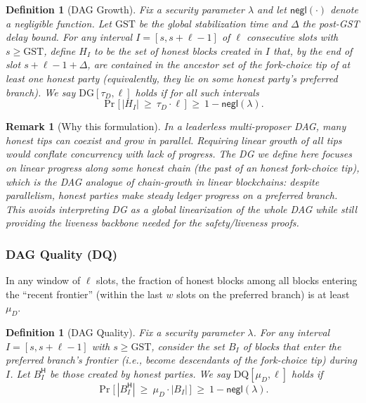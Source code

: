 \documentclass[11pt]{article}
\newtheorem{definition}[theorem]{Definition}
\newtheorem{remark}[theorem]{Remark}
\newcommand{\negl}{\ensuremath{\mathsf{negl}}\xspace}
\begin{document}
\begin{definition}[DAG Growth]\label{def:DG}
Fix a security parameter $\lambda$ and let $\negl(\cdot)$ denote a negligible function.
Let $\mathrm{GST}$ be the global stabilization time and $\Delta$ the post-GST delay bound.
For any interval $I=[s,s+\ell-1]$ of $\ell$ consecutive slots with $s\ge \mathrm{GST}$, define $H_I$ to be the set of honest blocks created in $I$ that, by the end of slot $s+\ell-1+\Delta$, are contained in the ancestor set of the fork-choice tip of at least one honest party (equivalently, they lie on some honest party’s preferred branch).
We say $\mathrm{DG}[\tau_D,\ell]$ holds if for all such intervals
\[
\Pr\!\big[\,|H_I|\ \ge\ \tau_D\cdot \ell\,\big]\ \ge\ 1-\negl(\lambda).
\]
\end{definition}

\begin{remark}[Why this formulation]
In a leaderless multi-proposer DAG, many honest tips can coexist and grow in parallel.
Requiring linear growth of \emph{all} tips would conflate concurrency with lack of progress.
The DG we define here focuses on \emph{linear progress along some honest chain} (the past of an honest fork-choice tip), which is the DAG analogue of chain-growth in linear blockchains: despite parallelism, honest parties make steady ledger progress on a preferred branch.
This avoids interpreting DG as a global linearization of the whole DAG while still providing the liveness backbone needed for the safety/liveness proofs.
\end{remark}





\subsubsection{DAG Quality (DQ)}
\label{sec:DQ}

In any window of $\ell$ slots, the fraction of honest blocks among all blocks entering the “recent frontier” (within the last $w$ slots on the preferred branch) is at least $\mu_D$.



\begin{definition}[DAG Quality]\label{def:DQ}
Fix a security parameter $\lambda$. For any interval $I=[s,s+\ell-1]$ with $s\ge \mathrm{GST}$, consider the set $B_I$ of blocks that enter the preferred branch's frontier (i.e., become descendants of the fork-choice tip) during $I$. Let $B_I^{\mathsf{H}}$ be those created by honest parties.
We say $\mathrm{DQ}[\mu_D,\ell]$ holds if
\begin{equation*}
\Pr\big[\,|B_I^{\mathsf{H}}|\ \ge\ \mu_D \cdot |B_I|\,\big]\ \ge\ 1-\negl(\lambda).
\end{equation*}
\end{definition}
\end{document}

